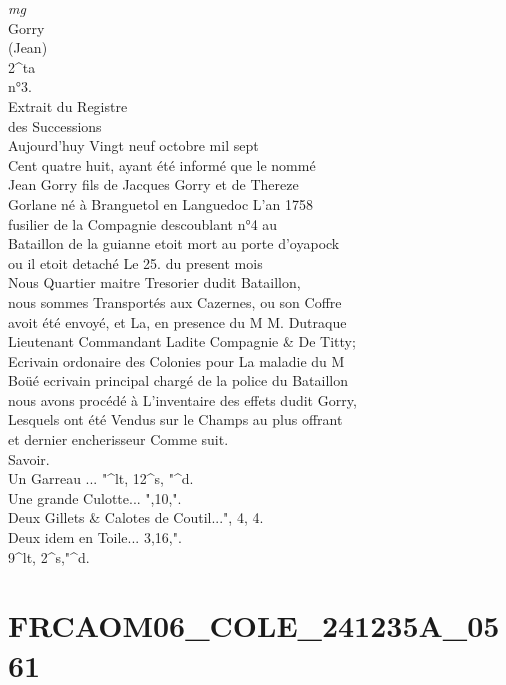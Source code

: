 \documentclass{article}
\begin{document}
\begin{pages}
\vspace{0.5cm}\noindent
\textit{mg}
\footnotesize \\
Gorry\\
(Jean)\\
2\^{}ta\\
n°3.
\normalsize \pstart
\\
Extrait du Registre\\
des Successions\\
Aujourd'huy Vingt neuf octobre mil sept\\
Cent quatre huit, ayant été informé que le nommé\\
Jean Gorry fils de Jacques Gorry et de Thereze\\
Gorlane né à Branguetol en Languedoc L'an 1758\\
fusilier de la Compagnie descoublant n°4 au\\
Bataillon de la guianne etoit mort au porte d'oyapock\\
ou il etoit detaché Le 25. du present mois\\
Nous Quartier maitre Tresorier dudit Bataillon,\\
nous sommes Transportés aux Cazernes, ou son Coffre\\
avoit été envoyé, et La, en presence du M M. Dutraque\\
Lieutenant Commandant Ladite Compagnie \& De Titty;\\
Ecrivain ordonaire des Colonies pour La maladie du M\\
Boüé ecrivain principal chargé de la police du Bataillon\\
nous avons procédé à L'inventaire des effets dudit Gorry,\\
Lesquels ont été Vendus sur le Champs au plus offrant\\
et dernier encherisseur Comme suit.\\
Savoir.\\
Un Garreau ... "\^{}lt, 12\^{}s, "\^{}d.\\
Une grande Culotte... ",10,".\\
Deux Gillets \& Calotes de Coutil...", 4, 4.\\
Deux idem en Toile... 3,16,".\\
9\^{}lt, 2\^{}s,"\^{}d.
\pend
\endnumbering\beginnumbering\section{FRCAOM06\_COLE\_241235A\_0561}\pstart
\\

\end{pages}
\end{document}
